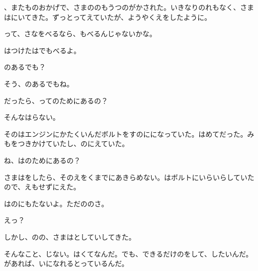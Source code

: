 、またものおかげで、さまののもうつのがかされた。いきなりのれもなく、さまはにいてきた。ずっとってえていたが、ようやくえをしたように。

って、さなをべるなら、もべるんじゃないかな。

はつけたはでもべるよ。

のあるでも？

そう、のあるでもね。

だったら、ってのためにあるの？

そんなはらない。

そのはエンジンにかたくいんだボルトをすのにになっていた。はめてだった。みもをつきかけていたし、のにえていた。

ね、はのためにあるの？

さまはをしたら、そのえをくまでにあきらめない。はボルトにいらいらしていたので、えもせずにえた。

はのにもたないよ。ただののさ。

えっ？

しかし、のの、さまはとしていしてきた。

そんなこと、じない。はくてなんだ。でも、できるだけのをして、したいんだ。があれば、いになれるとっているんだ。

